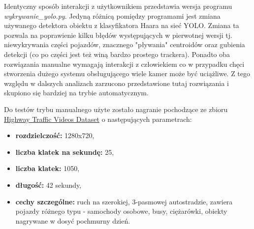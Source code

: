 \documentclass[a4paper]{article}
\begin{document}
Identyczny sposób interakcji z użytkownikiem przedstawia wersja programu \textit{wykrywanie\_yolo.py}. Jedyną różnicą pomiędzy programami jest zmiana używanego detektora obiektu z klasyfikatora Haara na sieć YOLO.
Zmiana ta pozwala na poprawienie kilku błędów występujących w pierwotnej wersji tj. niewykrywania części pojazdów, znacznego "pływania" centroidów oraz gubienia detekcji (co po części jest też winą bardzo prostego trackera). Ponadto oba rozwiązania manualne wymagają interakcji z człowiekiem co w przypadku chęci stworzenia dużego systemu obsługującego wiele kamer może być uciążliwe. Z tego względu w dalszych analizach zarzucono przedstawione tutaj rozwiązania i skupiono się bardziej na trybie automatycznym.

Do testów trybu manualnego użyte zostało nagranie pochodzące ze zbioru \href{https://www.kaggle.com/datasets/aryashah2k/highway-traffic-videos-dataset}{Highway Traffic Videos Dataset} o następujących parametrach:
\begin{itemize}
    \item \textbf{rozdzielczość:} 1280x720,
    \item \textbf{liczba klatek na sekundę:} 25,
    \item \textbf{liczba klatek:} 1050,
    \item \textbf{długość:} 42 sekundy,
    \item \textbf{cechy szczególne:} ruch na szerokiej, 3-pasmowej autostradzie, zawiera pojazdy różnego typu - samochody osobowe, busy, ciężarówki, obiekty nagrywane w dosyć pochmurny dzień.
\end{itemize}
\end{document}
